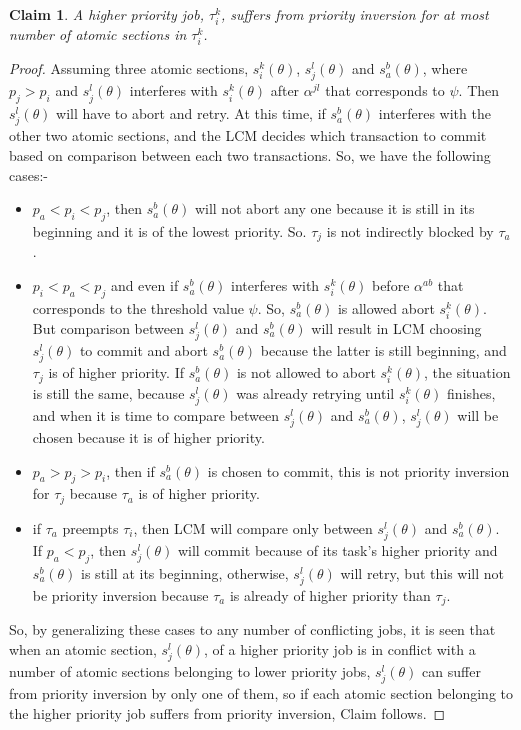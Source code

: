 \documentclass[conference]{IEEEtran}
\newtheorem{clm}{Claim}
\begin{document}
\begin{clm}
\label{priority_inversion}
A higher priority job, $\tau_i^k$, suffers from priority inversion for at most number of atomic sections in $\tau_i^k$.
\end{clm}
\begin{proof}
Assuming three atomic sections, $s_i^k(\theta)$, $s_j^l(\theta)$ and $s_a^b(\theta)$, where $p_j > p_i$ and $s_j^l(\theta)$ interferes with $s_i^k(\theta)$ after $\alpha^{jl}$ that corresponds to $\psi$. Then $s_j^l(\theta)$ will have to abort and retry. At this time, if $s_a^b(\theta)$ interferes with the other two atomic sections, and the LCM decides which transaction to commit based on comparison between each two transactions. So, we have the following cases:-
\begin{itemize}
\item $p_a < p_i < p_j$, then $s_a^b(\theta)$ will not abort any one because it is still in its beginning and it is of the lowest priority. So. $\tau_j$ is not indirectly blocked by $\tau_a$.
\item $p_i<p_a<p_j$ and even if $s_a^b(\theta)$ interferes with $s_i^k(\theta)$ before $\alpha^{ab}$ that corresponds to the threshold value $\psi$. So, $s_a^b(\theta)$ is allowed abort $s_i^k(\theta)$. But comparison between $s_j^l(\theta)$ and $s_a^b(\theta)$ will result in LCM choosing $s_j^l(\theta)$ to commit and abort $s_a^b(\theta)$ because the latter is still beginning, and $\tau_j$ is of higher priority. If $s_a^b(\theta)$ is not allowed to abort $s_i^k(\theta)$, the situation is still the same, because $s_j^l(\theta)$ was already retrying until $s_i^k(\theta)$ finishes, and when it is time to compare between $s_j^l(\theta)$ and $s_a^b(\theta)$, $s_j^l(\theta)$ will be chosen because it is of higher priority.
\item $p_a>p_j>p_i$, then if $s_a^b(\theta)$ is chosen to commit, this is not priority inversion for $\tau_j$ because $\tau_a$ is of higher priority.
\item if $\tau_a$ preempts $\tau_i$, then LCM will compare only between $s_j^l(\theta)$ and $s_a^b(\theta)$. If $p_a<p_j$, then $s_j^l(\theta)$ will commit because of its task's higher priority and $s_a^b(\theta)$ is still at its beginning, otherwise, $s_j^l(\theta)$ will retry, but this will not be priority inversion because $\tau_a$ is already of higher priority than $\tau_j$.
\end{itemize}
So, by generalizing these cases to any number of conflicting jobs, it is seen that when an atomic section, $s_j^l(\theta)$, of a higher priority job is in conflict with a number of atomic sections belonging to lower priority jobs, $s_j^l(\theta)$ can suffer from priority inversion by only one of them, so if each atomic section belonging to the higher priority job suffers from priority inversion, Claim follows.
\end{proof}
\end{document}
